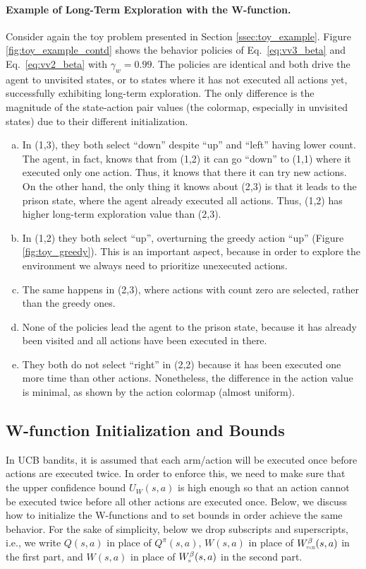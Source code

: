 \documentclass{article}
\newcommand{\textsub}[1]{\textsc{\tiny #1}} \newcommand{\func}[2]{\textsf{#1}(#2)} \newcommand{\hl}[1]{\textcolor{red}{{#1}}} \newcommand{\hll}[1]{\textcolor{blue}{{#1}}}
\begin{document}
\paragraph{Example of Long-Term Exploration with the W-function.}
Consider again the toy problem presented in Section \ref{ssec:toy_example}. Figure \ref{fig:toy_example_contd} shows the behavior policies of Eq.~\eqref{eq:vv3_beta} and Eq.~\eqref{eq:vv2_beta} with $\gamma_w = 0.99$. The policies are identical and both drive the agent to unvisited states, or to states where it has not executed all actions yet, successfully exhibiting long-term exploration. The only difference is the magnitude of the state-action pair values (the colormap, especially in unvisited states) due to their different initialization.
\begin{enumerate}[a)]
\setlength{\itemsep}{0pt}
\item In (1,3), they both select ``down'' despite ``up'' and ``left'' having lower count. The agent, in fact, knows that from (1,2) it can go ``down'' to (1,1) where it executed only one action. Thus, it knows that there it can try new actions. On the other hand, the only thing it knows about (2,3) is that it leads to the prison state, where the agent already executed all actions. Thus, (1,2) has higher long-term exploration value than (2,3).
\item In (1,2) they both select ``up'', overturning the greedy action ``up'' (Figure \ref{fig:toy_greedy}). This is an important aspect, because in order to explore the environment we always need to prioritize unexecuted actions.
\item The same happens in (2,3), where actions with count zero are selected, rather than the greedy ones.
\item None of the policies lead the agent to the prison state, because it has already been visited and all actions have been executed in there.
\item They both do not select ``right'' in (2,2) because it has been executed one more time than other actions. Nonetheless, the difference in the action value is minimal, as shown by the action colormap (almost uniform).
\end{enumerate}

\subsection{W-function Initialization and Bounds}
\label{ssec:vv_init}
In UCB bandits, it is assumed that each arm/action will be executed once before actions are executed twice. In order to enforce this, we need to make sure that the upper confidence bound $U_W(s,a)$ is high enough so that an action cannot be executed twice before all other actions are executed once.
Below, we discuss how to initialize the W-functions and to set bounds in order achieve the same behavior.
For the sake of simplicity, below we drop subscripts and superscripts, i.e., we write $Q(s,a)$ in place of $Q^\pi(s,a)$, $W(s,a)$ in place of $W^\beta_{\textsub{ucb}}(s,a)$ in the first part, and $W(s,a)$ in place of $W^\beta_{\textsub{n}}(s,a)$ in the second part.
\end{document}
